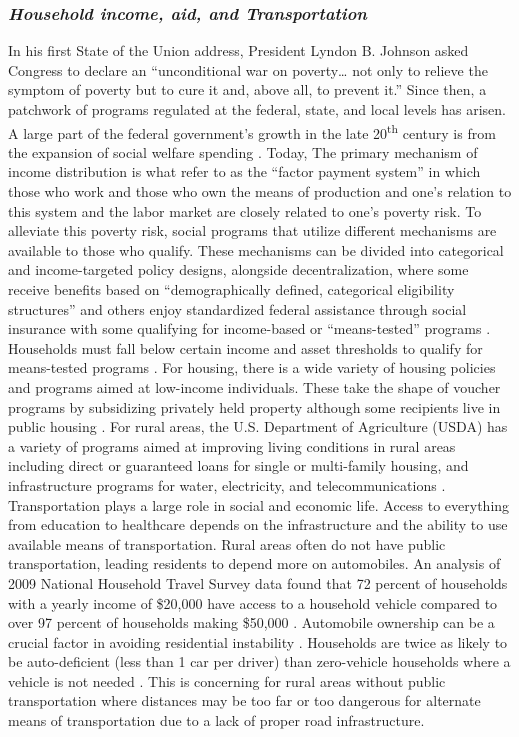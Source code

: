 \subsubsection{\textit{Household income, aid, and Transportation}}
In his first State of the Union address, President Lyndon B. Johnson asked Congress to declare an “unconditional war on poverty… not only to relieve the symptom of poverty but to cure it and, above all, to prevent it.” %
Since then, a patchwork of programs regulated at the federal, state, and local levels has arisen. A large part of the federal government's growth in the late 20\textsuperscript{th} century is from the expansion of social welfare spending \citep{fishback_social_2020}. Today, The primary mechanism of income distribution is what \citet{berkowitz_gaps_2023} refer to as the “factor payment system” in which those who work and those who own the means of production and one’s relation to this system and the labor market are closely related to one’s poverty risk. To alleviate this poverty risk, social programs that utilize different mechanisms are available to those who qualify. These mechanisms can be divided into categorical and income-targeted policy designs, alongside decentralization, where some receive benefits based on “demographically defined, categorical eligibility structures” and others enjoy standardized federal assistance through social insurance with some qualifying for income-based or “means-tested” programs \citep{bruch_poverty_2023}. Households must fall below certain income and asset thresholds to qualify for means-tested programs \citep{rank_welfare_2002}. For housing, there is a wide variety of housing policies and programs aimed at low-income individuals. These take the shape of voucher programs by subsidizing privately held property although some recipients live in public housing \citep{kim_housing_2017}. For rural areas, the U.S. Department of Agriculture (USDA) has a variety of programs aimed at improving living conditions in rural areas including direct or guaranteed loans for single or multi-family housing, and infrastructure programs for water, electricity, and telecommunications \citep{noauthor_usda_2023}. Transportation plays a large role in social and economic life. Access to everything from education to healthcare depends on the infrastructure and the ability to use available means of transportation. Rural areas often do not have public transportation, leading residents to depend more on automobiles. An analysis of 2009 National Household Travel Survey data found that 72 percent of households with a yearly income of \$20,000 have access to a household vehicle compared to over 97 percent of households making \$50,000 \citep{blumenberg_automobile_2012}. Automobile ownership can be a crucial factor in avoiding residential instability \citep{kang_why_2019}. Households are twice as likely to be auto-deficient (less than 1 car per driver) than zero-vehicle households where a vehicle is not needed \citep{blumenberg_car-deficit_2020}. This is concerning for rural areas without public transportation where distances may be too far or too dangerous for alternate means of transportation due to a lack of proper road infrastructure.
 
